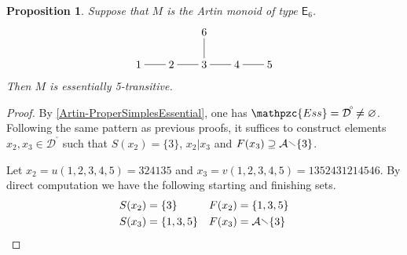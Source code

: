 \documentclass[a4paper,final]{article}
\let\emptyset\varnothing
\theoremstyle{plain}
\newtheorem{proposition}[proposition]{Proposition}
\theoremstyle{remark}
\theoremstyle{definition}
\begin{document}
\begin{proposition}
  Suppose that $M$ is the Artin monoid of type ${\mathsf{{E}}}_6$.
  \[
    \begin{xy}
      0;<3em,0em>:<0em,3em>::
      
      (0,0)*+{1}="1";
      (1,0)*+{2}="2";
      (2,0)*+{3}="3";
      (3,0)*+{4}="4";
      (4,0)*+{5}="5";
      (2,1)*+{6}="6";
      
      {\ar@{-}     "1";"2"};
      {\ar@{-}     "2";"3"};
      {\ar@{-}     "3";"4"};
      {\ar@{-}     "4";"5"};
      {\ar@{-}     "3";"6"};
    \end{xy}
  \]
  Then $M$ is essentially 5-transitive.
\end{proposition}
\begin{proof}
  By \autoref{Artin-ProperSimplesEssential}, one has ${\mathpzc{Ess}}={{\mathcal{D}}^{\!{}^{\circ}\!}}\neq\emptyset$.
  Following the same pattern as previous proofs, it suffices to
  construct elements $x_2, x_3 \in {{\mathcal{D}}^{\!{}^{\circ}\!}}$ such that ${S}(x_2) =
  \{3\}$, $x_2 | x_3$ and ${F}(x_3) \supseteq {\mathcal{A}} {\mathbin{\raisebox{0.25ex}{$\smallsetminus$}}} \{3\}$.

  Let $x_2 = u(1,2,3,4,5) = 324135$ and $x_3 = v(1,2,3,4,5) = 1352431214546$.
  By direct computation we have the following starting and finishing sets.
  \begin{align*}
    {S}(x_2) &= \{ 3 \} &
    {F}(x_2) &= \{ 1, 3, 5 \} \\
    {S}(x_3) &= \{ 1, 3, 5 \} &
    {F}(x_3) &= {\mathcal{A}}{\mathbin{\raisebox{0.25ex}{$\smallsetminus$}}}\{ 3 \}
  \end{align*}
\end{proof}
\end{document}
